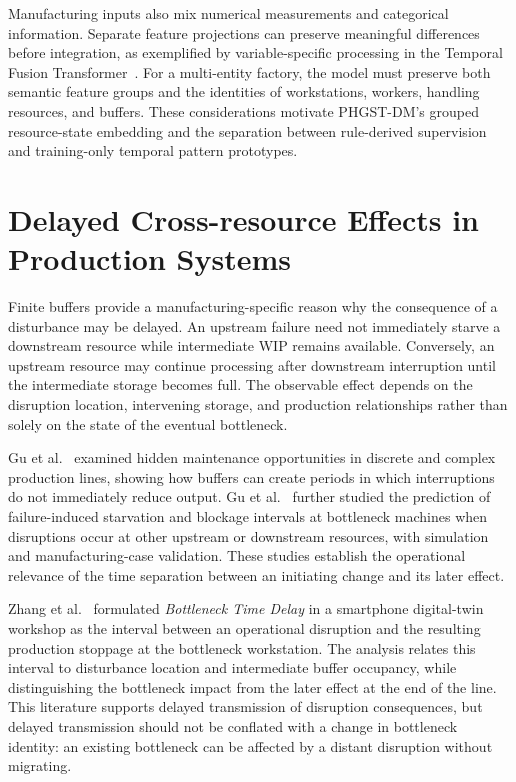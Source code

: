 Manufacturing inputs also mix numerical measurements and categorical information. Separate feature projections can preserve meaningful differences before integration, as exemplified by variable-specific processing in the Temporal Fusion Transformer~\cite{lim2021tft}. For a multi-entity factory, the model must preserve both semantic feature groups and the identities of workstations, workers, handling resources, and buffers. These considerations motivate PHGST-DM's grouped resource-state embedding and the separation between rule-derived supervision and training-only temporal pattern prototypes.

\section{Delayed Cross-resource Effects in Production Systems}\label{delayed-cross-resource-effects-in-production-systems}

Finite buffers provide a manufacturing-specific reason why the consequence of a disturbance may be delayed. An upstream failure need not immediately starve a downstream resource while intermediate WIP remains available. Conversely, an upstream resource may continue processing after downstream interruption until the intermediate storage becomes full. The observable effect depends on the disruption location, intervening storage, and production relationships rather than solely on the state of the eventual bottleneck.

Gu et al.~\cite{gu2013hidden} examined hidden maintenance opportunities in discrete and complex production lines, showing how buffers can create periods in which interruptions do not immediately reduce output. Gu et al.~\cite{gu2015passive} further studied the prediction of failure-induced starvation and blockage intervals at bottleneck machines when disruptions occur at other upstream or downstream resources, with simulation and manufacturing-case validation. These studies establish the operational relevance of the time separation between an initiating change and its later effect.

Zhang et al.~\cite{zhang2022vulnerability} formulated \emph{Bottleneck Time Delay} in a smartphone digital-twin workshop as the interval between an operational disruption and the resulting production stoppage at the bottleneck workstation. The analysis relates this interval to disturbance location and intermediate buffer occupancy, while distinguishing the bottleneck impact from the later effect at the end of the line. This literature supports delayed transmission of disruption consequences, but delayed transmission should not be conflated with a change in bottleneck identity: an existing bottleneck can be affected by a distant disruption without migrating.

